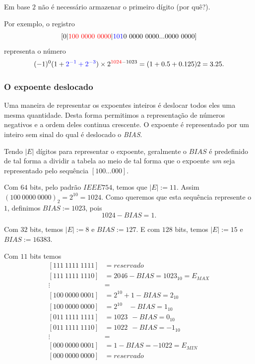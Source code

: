 Em base $2$ não é necessário armazenar o primeiro dígito (por quê?).

Por exemplo, o registro
$$
[0|{\color{red}{100~0000~0000}} |{\color{blue}{101}}0~0000~0000...0000~0000]
$$
representa o número
$$
(-1)^0(1+{\color{blue}{2^{-1}+2^{-3}}})\times  2^{{\color{red}{1024}}-1023}=(1+0.5+0.125)2=3.25.
$$



\subsubsection{O expoente deslocado}
Uma maneira de representar os expoentes inteiros é deslocar todos eles uma mesma quantidade. Desta forma permitimos a representação de números negativos e a ordem deles continua crescente. O expoente é representado por um inteiro sem sinal do qual é deslocado o \emph{BIAS}.

Tendo $|E|$ dígitos para representar o expoente, geralmente o $BIAS$ é predefinido de tal forma a dividir a tabela ao meio de tal forma que o expoente \textit{um} seja representado pelo sequência $[100...000]$. 

\begin{ex}
Com $64$ bits, pelo padrão $IEEE754$, temos que $|E|:=11$. Assim $(100~0000~0000)_2=2^{10}=1024$. Como queremos que esta sequência represente o $1$, definimos $BIAS:=1023$, pois
$$ 1024-BIAS=1.$$

Com $32$ bits, temos $|E|:=8$ e $BIAS:=127$. E com $128$ bits, temos $|E|:=15$ e $BIAS:=16383$.
\end{ex}


Com $11$ bits temos 
\begin{equation*}
  \begin{split}
 [111~1111~1111] &= reservado\\
 [111~1111~1110] &= 2046-BIAS      = 1023_{10}= E_{MAX}\\
     \vdots      &=  \\
 [100~0000~0001] &= 2^{10}+1  -BIAS =  2_{10} \\
 [100~0000~0000] &= 2^{10}~~~~-BIAS =  1_{10} \\
 [011~1111~1111] &= 1023   ~~ -BIAS =  0_{10} \\
 [011~1111~1110] &= 1022   ~~ -BIAS = -1_{10} \\
     \vdots      &=  \\
 [000~0000~0001] &= 1-BIAS = -1022 = E_{MIN}\\
 [000~0000~0000] &= reservado    
  \end{split}
\end{equation*}

